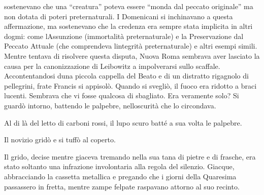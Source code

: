 sostenevano che una ``creatura'' poteva essere ``monda dal peccato
originale'' ma non dotata di poteri preternaturali. I Domenicani si
inchinavano a questa affermazione, ma sostenevano che la credenza era
sempre stata implicita in altri dogmi: come l\textquotesingle Assunzione
(immortalità preternaturale) e la Preservazione dal Peccato Attuale (che
comprendeva l\textquotesingle integrità preternaturale) e altri esempi
simili. Mentre tentava di risolvere questa disputa, Nuova Roma sembrava
aver lasciato la causa per la canonizzazione di Leibowitz a impolverarsi
sullo scaffale. Accontentandosi d\textquotesingle una piccola cappella
del Beato e di un distratto rigagnolo di pellegrini, frate Francis si
appisolò. Quando si svegliò, il fuoco era ridotto a braci lucenti.
Sembrava che vi fosse qualcosa di sbagliato. Era veramente solo? Si
guardò intorno, battendo le palpebre, nell\textquotesingle oscurità che
lo circondava.

Al di là del letto di carboni rossi, il lupo scuro batté a sua volta le
palpebre.

Il novizio gridò e si tuffò al coperto.

Il grido, decise mentre giaceva tremando nella sua tana di pietre e di
frasche, era stato soltanto una infrazione involontaria alla regola del
silenzio. Giacque, abbracciando la cassetta metallica e pregando che i
giorni della Quaresima passassero in fretta, mentre zampe felpate
raspavano attorno al suo recinto.
